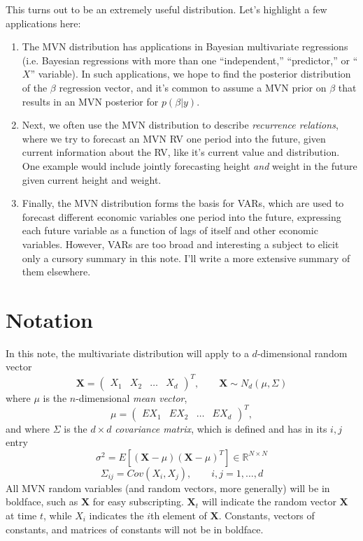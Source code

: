 \documentclass[a4paper,12pt]{scrartcl}
\begin{document}
This turns out to be an extremely useful distribution. Let's highlight
a few applications here: 
\begin{enumerate}
    \item The MVN distribution has applications in Bayesian multivariate 
	regressions (i.e. Bayesian regressions with more than one 
	``independent,'' ``predictor,'' or ``$X$'' variable). 
	In such applications, we hope to find the posterior distribution
	of the $\beta$ regression vector, and it's common to assume
	a MVN prior on $\beta$ that results in an MVN posterior for
	$p(\beta|y)$.
    \item Next, we often use the MVN distribution to describe
	\emph{recurrence relations}, where we try to 
	forecast an MVN RV one period into the future, given
	current information about the RV, like it's current value
	and distribution. One example would include jointly forecasting 
	height \emph{and} weight in the future given current height
	and weight.
    \item Finally, the MVN distribution forms the basis for 
	VARs, which are used to forecast different economic variables 
	one period into the future, expressing each future variable
	as a function of lags of itself and other economic variables.
	However, VARs are too broad and interesting a subject to 
	elicit only a cursory summary in this note.  I'll write
	a more extensive summary of them elsewhere.
\end{enumerate}


\tableofcontents

\vskip 1in

\section{Notation}

In this note, the multivariate distribution will apply to a
$d$-dimensional random vector 
\[ \mathbf{X} = \begin{pmatrix} X_1 & X_2 & \ldots & X_d \end{pmatrix}^T,
    \qquad \mathbf{X}  \sim N_d(\mu, \Sigma) \]
where $\mu$ is the $n$-dimensional \emph{mean vector},
\[ \mu = \begin{pmatrix} EX_1 & EX_2 & \ldots & EX_d \end{pmatrix}^T,
      \]
and where $\Sigma$ is the $d\times d$ \emph{covariance matrix}, which
is defined and has in its $i,j$ entry
\[ \sigma^2 = E\left[ (\mathbf{X} - \mu) (\mathbf{X}-\mu)^T\right] \in
   \mathbb{R}^{N\times N} \] 
\[ \Sigma_{ij} = Cov(X_i, X_j), \qquad i,j = 1, \ldots, d\]
All MVN random variables (and random vectors, more generally) will be in 
boldface, such as $\mathbf{X}$ for easy subscripting.  
$\mathbf{X}_t$ will indicate the random vector $\mathbf{X}$ at 
time $t$, while $X_i$ indicates the $i$th element of $\mathbf{X}$.
Constants, vectors of constants, and matrices of constants will not be 
in boldface.
\end{document}
